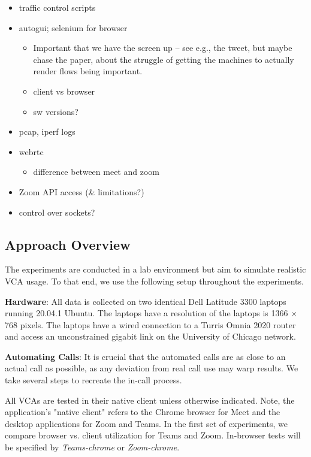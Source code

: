 \begin{itemize}
    \item traffic control scripts
    \item autogui; selenium for browser
          \begin{itemize}
              \item Important that we have the screen up -- see e.g., the tweet, but maybe chase the paper, about the struggle of getting the machines to actually render flows being important.
              \item client vs browser
              \item sw versions?
          \end{itemize}
    \item pcap, iperf logs
    \item webrtc
          \begin{itemize}
              \item difference between meet and zoom 
          \end{itemize}
    \item Zoom API access (\& limitations?)
    \item control over sockets?
\end{itemize}

\subsection{Approach Overview}
The experiments are conducted in a lab environment but aim to simulate realistic VCA usage. To that end, we use the following setup throughout the experiments.

\textbf{Hardware}: All data is collected on two identical Dell Latitude 3300 laptops running 20.04.1 Ubuntu. The laptops have a resolution of the laptops is 1366 $\times$ 768 pixels. The laptops have a wired connection to a Turris Omnia 2020 router and access an unconstrained gigabit link on the University of Chicago network. 

\textbf{Automating Calls}: It is crucial that the automated calls are as close to an actual call as possible, as any deviation from real call use may warp results. We take several steps to recreate the in-call process.

All VCAs are tested in their native client unless otherwise indicated. Note, the application's "native client" refers to the Chrome browser for Meet and the desktop applications for Zoom and Teams. In the first set of experiments, we compare browser vs. client utilization for Teams and Zoom. In-browser tests will be specified by \textit{Teams-chrome} or \textit{Zoom-chrome}. 

